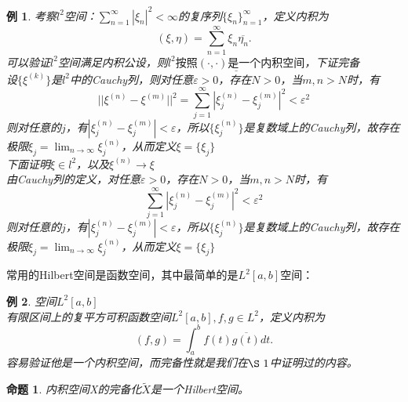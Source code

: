 \documentclass[12pt, a4paper, oneside, fontset=windows]{ctexbook}
\newtheorem{example}{例}[section]
\newtheorem{proposition}[theorem]{命题}
\begin{document}
    \begin{example}
        考察$l^2$空间：$\displaystyle \sum_{n=1}^{\infty}|\xi _n|^2<\infty$的复序列$\{\xi_n\}_{n=1}^{\infty}$，定义内积为
        \[
            (\xi,\eta)=\sum_{n=1}^{\infty}\xi_n\overline{\eta_n}.
        \]
        可以验证$l^2$空间满足内积公设，则$\underline{l^2 \text{按照}{(\cdot ,\cdot)}\text{是一个内积空间}}$，下证完备\\
        设$\{\xi^{(k)}\}$是$l^2$中的Cauchy列，则对任意$\varepsilon >0$，存在$N>0$，当$m,n>N$时，有
        \[||\xi^{(n)}-\xi^{(m)}||^2=\sum_{j=1}^{\infty}|\xi_j^{(n)}-\xi_j^{(m)}|^2<\varepsilon ^2\]
        则对任意的$j$，有$|\xi_j^{(n)}-\xi_j^{(m)}|<\varepsilon$，所以$\{\xi_j^{(n)}\}$是复数域上的Cauchy列，故存在极限$\xi_j=\lim_{n\to \infty}\xi_j^{(n)}$，从而定义$\xi=\{\xi_j\}$\\
        下面证明$\xi \in l^2$，以及$\xi^{(n)}\to \xi$\\
        由Cauchy列的定义，对任意$\varepsilon >0$，存在$N>0$，当$m,n>N$时，有
        \[\sum_{j=1}^{\infty}|\xi_j^{(n)}-\xi_j^{(m)}|^2<\varepsilon ^2\]   则对任意的$j$，有$|\xi_j^{(n)}-\xi_j^{(m)}|<\varepsilon$，所以$\{\xi_j^{(n)}\}$是复数域上的Cauchy列，故存在极限$\xi_j=\lim_{n\to \infty}\xi_j^{(n)}$，从而定义$\xi=\{\xi_j\}$\\
    \end{example}

    常用的Hilbert空间是函数空间，其中最简单的是$L^2[a,b]$空间：
    \begin{example}
        空间$L^2[a,b]$\\
        有限区间上的复平方可积函数空间$L^2[a,b],f,g\in L^2$，定义内积为
        \[
            (f,g)=\int_a^b f(t)\overline{g(t)}dt.
        \]
        容易验证他是一个内积空间，而完备性就是我们在$\S \  1$中证明过的内容。
    \end{example}

    \begin{proposition}
        内积空间X的完备化$\widetilde{X}$是一个Hilbert空间。
    \end{proposition}
\end{document}
